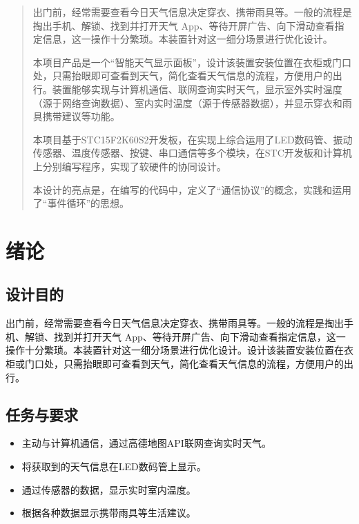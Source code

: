 \documentclass{article}
\begin{document}
\clearpage

\begin{abstract}

出门前，经常需要查看今日天气信息决定穿衣、携带雨具等。一般的流程是掏出手机、解锁、找到并打开天气 App、等待开屏广告、向下滑动查看指定信息，这一操作十分繁琐。本装置针对这一细分场景进行优化设计。

本项目产品是一个“智能天气显示面板”，设计该装置安装位置在衣柜或门口处，只需抬眼即可查看到天气，简化查看天气信息的流程，方便用户的出行。装置能够实现与计算机通信、联网查询实时天气，显示室外实时温度（源于网络查询数据）、室内实时温度（源于传感器数据），并显示穿衣和雨具携带建议等功能。

本项目基于STC15F2K60S2开发板，在实现上综合运用了LED数码管、振动传感器、温度传感器、按键、串口通信等多个模块，在STC开发板和计算机上分别编写程序，实现了软硬件的协同设计。

本设计的亮点是，在编写的代码中，定义了“通信协议”的概念，实践和运用了“事件循环”的思想。

\end{abstract}

\clearpage

\tableofcontents

\clearpage

\section{绪论}

\subsection{设计目的}

出门前，经常需要查看今日天气信息决定穿衣、携带雨具等。一般的流程是掏出手机、解锁、找到并打开天气 App、等待开屏广告、向下滑动查看指定信息，这一操作十分繁琐。本装置针对这一细分场景进行优化设计。设计该装置安装位置在衣柜或门口处，只需抬眼即可查看到天气，简化查看天气信息的流程，方便用户的出行。

\subsection{任务与要求}

\begin{itemize}
  \item 主动与计算机通信，通过高德地图API联网查询实时天气。
  \item 将获取到的天气信息在LED数码管上显示。
  \item 通过传感器的数据，显示实时室内温度。
  \item 根据各种数据显示携带雨具等生活建议。
\end{itemize}
\end{document}
